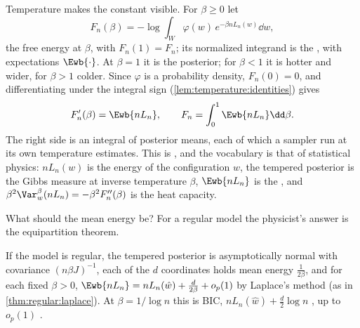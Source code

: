 \begin{refsection}
Temperature makes the constant visible. For $\beta\ge0$ let
\[
F_n(\beta)=-\log\int_W\varphi(w)\,e^{-\beta nL_n(w)}\dd w ,
\]
the free energy at  $\beta$, with $F_n(1)=F_n$; its normalized integrand is the , with expectations $\Ewb{\cdot}$. At $\beta=1$ it is the posterior; for $\beta<1$ it is hotter and wider, for $\beta>1$ colder. Since $\varphi$ is a probability density, $F_n(0)=0$, and differentiating under the integral sign (\cref{lem:temperature:identities}) gives
\begin{equation}\label{eq:temperature:ti}
F_n'(\beta)=\Ewb{nL_n},\qquad F_n=\int_0^1\Ewb{nL_n}\dd\beta .
\end{equation}
The right side is an integral of posterior means, each of which a sampler run at its own temperature estimates. This is , and the vocabulary is that of statistical physics: $nL_n(w)$ is the energy of the configuration $w$, the tempered posterior is the Gibbs measure at inverse temperature $\beta$, $\Ewb{nL_n}$ is the , and $\beta^2\Var^\beta_w(nL_n)=-\beta^2F_n''(\beta)$ is the heat capacity.

What should the mean energy be? For a regular model the physicist's answer is the equipartition theorem.

\begin{regularanswer}[equipartition]
If the model is regular, the tempered posterior is asymptotically normal with covariance $(n\beta J)^{-1}$, each of the $d$ coordinates holds mean energy $\frac1{2\beta}$, and for each fixed $\beta>0$, $\Ewb{nL_n}=nL_n(\hat w)+\frac d{2\beta}+o_p(1)$ by Laplace's method (as in \cref{thm:regular:laplace}). At $\beta=1/\log n$ this is BIC, $nL_n(\hat w)+\frac d2\log n$ \parencite{Schwarz1978}, up to $o_p(1)$ \parencite[Theorem~5]{Watanabe2013}.
\end{regularanswer}


\end{refsection}
